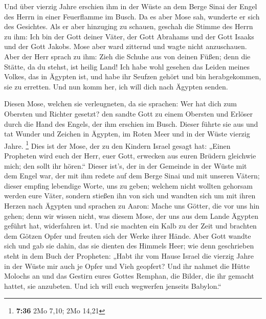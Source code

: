  Und über vierzig Jahre erschien ihm in der Wüste an dem
Berge Sinai der Engel des Herrn in einer Feuerflamme im Busch.
 Da es aber Mose sah, wunderte er sich des Gesichtes. Als
er aber hinzuging zu schauen, geschah die Stimme des Herrn zu ihm:
 Ich bin der Gott deiner Väter, der Gott Abrahams und der
Gott Isaaks und der Gott Jakobs. Mose aber ward zitternd und wagte nicht
anzuschauen.  Aber der Herr sprach zu ihm: Zieh die
Schuhe aus von deinen Füßen; denn die Stätte, da du stehst, ist heilig
Land!  Ich habe wohl gesehen das Leiden meines Volkes,
das in Ägypten ist, und habe ihr Seufzen gehört und bin herabgekommen,
sie zu erretten. Und nun komm her, ich will dich nach Ägypten senden.

 Diesen Mose, welchen sie verleugneten, da sie sprachen:
Wer hat dich zum Obersten und Richter gesetzt? den sandte Gott zu einem
Obersten und Erlöser durch die Hand des Engels, der ihm erschien im
Busch.  Dieser führte sie aus und tat Wunder und Zeichen
in Ägypten, im Roten Meer und in der Wüste vierzig Jahre. \footnote{\textbf{7:36}
  2Mo 7,10; 2Mo 14,21}  Dies ist der Mose, der zu den
Kindern Israel gesagt hat: „Einen Propheten wird euch der Herr, euer
Gott, erwecken aus euren Brüdern gleichwie mich; den sollt ihr hören.``
 Dieser ist's, der in der Gemeinde in der Wüste mit dem
Engel war, der mit ihm redete auf dem Berge Sinai und mit unseren
Vätern; dieser empfing lebendige Worte, uns zu geben; 
welchem nicht wollten gehorsam werden eure Väter, sondern stießen ihn
von sich und wandten sich um mit ihren Herzen nach Ägypten
 und sprachen zu Aaron: Mache uns Götter, die vor uns hin
gehen; denn wir wissen nicht, was diesem Mose, der uns aus dem Lande
Ägypten geführt hat, widerfahren ist.  Und sie machten
ein Kalb zu der Zeit und brachten dem Götzen Opfer und freuten sich der
Werke ihrer Hände.  Aber Gott wandte sich und gab sie
dahin, das sie dienten des Himmels Heer; wie denn geschrieben steht in
dem Buch der Propheten: „Habt ihr vom Hause Israel die vierzig Jahre in
der Wüste mir auch je Opfer und Vieh geopfert?  Und ihr
nahmet die Hütte Molochs an und das Gestirn eures Gottes Remphan, die
Bilder, die ihr gemacht hattet, sie anzubeten. Und ich will euch
wegwerfen jenseits Babylon.``

